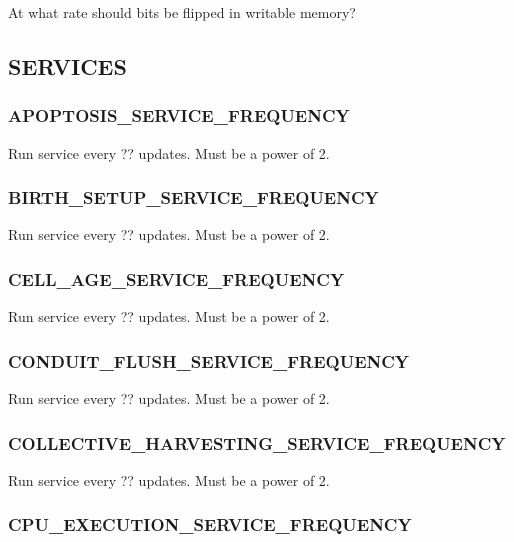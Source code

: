 
At what rate should bits be flipped in writable memory?

\subsection{SERVICES}

\subsubsection{APOPTOSIS\_SERVICE\_FREQUENCY}


Run service every ?? updates.
Must be a power of 2.

\subsubsection{BIRTH\_SETUP\_SERVICE\_FREQUENCY}


Run service every ?? updates.
Must be a power of 2.

\subsubsection{CELL\_AGE\_SERVICE\_FREQUENCY}


Run service every ?? updates.
Must be a power of 2.

\subsubsection{CONDUIT\_FLUSH\_SERVICE\_FREQUENCY}


Run service every ?? updates.
Must be a power of 2.

\subsubsection{COLLECTIVE\_HARVESTING\_SERVICE\_FREQUENCY}


Run service every ?? updates.
Must be a power of 2.

\subsubsection{CPU\_EXECUTION\_SERVICE\_FREQUENCY}

